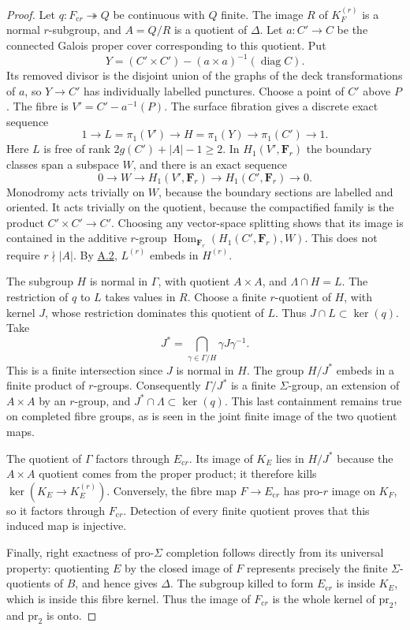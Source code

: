 \documentclass[11pt,a4paper]{article}
\newcommand{\F}{\mathbf F}
\newcommand{\pr}{\mathrm{pr}}
\newcommand{\Hom}{\operatorname{Hom}}
\newcommand{\crr}{\mathrm{c}r}
\newcommand{\statementref}[1]{\hyperlink{#1}{#1}}
\begin{document}
\begin{proof}
Let $q:F_{\crr}\twoheadrightarrow Q$ be continuous with $Q$ finite.
The image $R$ of $K_F^{(r)}$ is a normal $r$-subgroup, and
$A=Q/R$ is a quotient of $\Delta$. Let $a:C'\to C$ be the connected
Galois proper cover corresponding to this quotient. Put
\[
 Y=(C'\times C')-(a\times a)^{-1}(\operatorname{diag} C).
\]
Its removed divisor is the disjoint union of the graphs of the deck
transformations of $a$, so $Y\to C'$ has individually labelled
punctures. Choose a point of $C'$ above $P$. The fibre is
$V'=C'-a^{-1}(P)$. The surface fibration gives a discrete exact sequence
\[
 1\to L=\pi_1(V')\to H=\pi_1(Y)\to\pi_1(C')\to1.
\]
Here $L$ is free of rank $2g(C')+|A|-1\geq2$. In
$H_1(V',\F_r)$ the boundary classes span a subspace $W$, and there is
an exact sequence
\[
 0\to W\to H_1(V',\F_r)\to H_1(C',\F_r)\to0.
\]
Monodromy acts trivially on $W$, because the boundary sections are
labelled and oriented. It acts trivially on the quotient, because the
compactified family is the product $C'\times C'\to C'$. Choosing any
vector-space splitting shows that its image is contained in the additive
$r$-group $\Hom_{\F_r}(H_1(C',\F_r),W)$. This does not require
$r\nmid|A|$. By \statementref{A.2}, $L^{(r)}$ embeds in $H^{(r)}$.

The subgroup $H$ is normal in $\Gamma$, with quotient $A\times A$,
and $\Lambda\cap H=L$. The restriction of $q$ to $L$ takes values in
$R$. Choose a finite $r$-quotient of $H$, with kernel $J$, whose
restriction dominates this quotient of $L$. Thus
$J\cap L\subset\ker(q)$. Take
\[
 J^*=\bigcap_{\gamma\in\Gamma/H}\gamma J\gamma^{-1}.
\]
This is a finite intersection since $J$ is normal in $H$. The group
$H/J^*$ embeds in a finite product of $r$-groups. Consequently
$\Gamma/J^*$ is a finite $\Sigma$-group, an extension of $A\times A$
by an $r$-group, and $J^*\cap\Lambda\subset\ker(q)$. This last
containment remains true on completed fibre groups, as is seen in the
joint finite image of the two quotient maps.

The quotient of $\Gamma$ factors through $E_{\crr}$. Its image of
$K_E$ lies in $H/J^*$ because the $A\times A$ quotient comes from
the proper product; it therefore kills $\ker(K_E\to K_E^{(r)})$.
Conversely, the fibre map $F\to E_{\crr}$ has pro-$r$ image on
$K_F$, so it factors through $F_{\crr}$. Detection of every finite
quotient proves that this induced map is injective.

Finally, right exactness of pro-$\Sigma$ completion follows directly
from its universal property: quotienting $E$ by the closed image of
$F$ represents precisely the finite $\Sigma$-quotients of $B$, and
hence gives $\Delta$. The subgroup killed to form $E_{\crr}$ is
inside $K_E$, which is inside this fibre kernel. Thus the image of
$F_{\crr}$ is the whole kernel of $\pr_2$, and $\pr_2$ is onto.
\end{proof}
\end{document}

